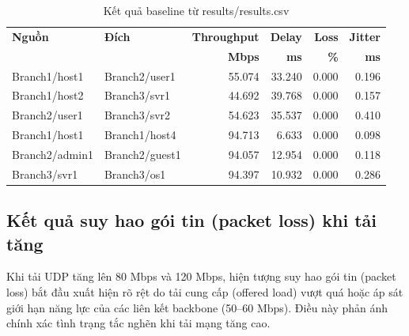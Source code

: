 \begin{table}[H]
\centering
\caption{Kết quả baseline từ results/results.csv}
\begin{tabularx}{\linewidth}{|X|X|r|r|r|r|}
\hline
\textbf{Nguồn} & \textbf{Đích} & \textbf{Throughput} & \textbf{Delay} & \textbf{Loss} & \textbf{Jitter} \\
 & & \textbf{Mbps} & \textbf{ms} & \textbf{\%} & \textbf{ms} \\
\hline
Branch1/host1 & Branch2/user1 & 55.074 & 33.240 & 0.000 & 0.196 \\
\hline
Branch1/host2 & Branch3/svr1 & 44.692 & 39.768 & 0.000 & 0.157 \\
\hline
Branch2/user1 & Branch3/svr2 & 54.623 & 35.537 & 0.000 & 0.410 \\
\hline
Branch1/host1 & Branch1/host4 & 94.713 & 6.633 & 0.000 & 0.098 \\
\hline
Branch2/admin1 & Branch2/guest1 & 94.057 & 12.954 & 0.000 & 0.118 \\
\hline
Branch3/svr1 & Branch3/os1 & 94.397 & 10.932 & 0.000 & 0.286 \\
\hline
\end{tabularx}
\end{table}

\subsection{Kết quả suy hao gói tin (packet loss) khi tải tăng}

Khi tải UDP tăng lên 80 Mbps và 120 Mbps, hiện tượng suy hao gói tin (packet loss) bắt đầu xuất hiện rõ rệt do tải cung cấp (offered load) vượt quá hoặc áp sát giới hạn năng lực của các liên kết backbone (50--60 Mbps). Điều này phản ánh chính xác tình trạng tắc nghẽn khi tải mạng tăng cao.

